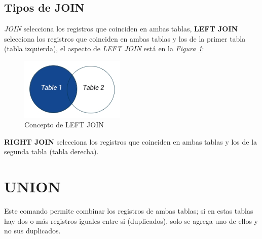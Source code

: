 \subsection{Tipos de JOIN}

\textit{JOIN} selecciona los registros que coinciden en ambas tablas, \textbf{LEFT JOIN} selecciona los registros que coinciden en ambas tablas y los de la primer tabla (tabla izquierda), el aspecto de \textit{LEFT JOIN} está en la \textit{Figura \ref{fig: 4}}:
\begin{figure}[H]
    \centering
    \caption{Concepto de LEFT JOIN}
    \label{fig: 4}
    \includegraphics[width=5cm]{ss/left_join.png}
\end{figure}

\textbf{RIGHT JOIN} selecciona los registros que coinciden en ambas tablas y los de la segunda tabla (tabla derecha).



\section{UNION}

Este comando permite combinar los registros de ambas tablas; si en estas tablas hay dos o más registros iguales entre si (duplicados), solo se agrega uno de ellos y no sus duplicados.


